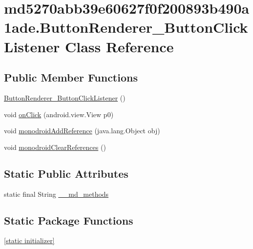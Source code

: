 \hypertarget{classmd5270abb39e60627f0f200893b490a1ade_1_1_button_renderer___button_click_listener}{
\section{md5270abb39e60627f0f200893b490a1ade.ButtonRenderer\_\-ButtonClickListener Class Reference}
\label{classmd5270abb39e60627f0f200893b490a1ade_1_1_button_renderer___button_click_listener}
}
\subsection*{Public Member Functions}
\begin{CompactItemize}
\item 
\hyperlink{classmd5270abb39e60627f0f200893b490a1ade_1_1_button_renderer___button_click_listener_067655cc5bd5198fa2b09218eb107c8a}{ButtonRenderer\_\-ButtonClickListener} ()
\item 
void \hyperlink{classmd5270abb39e60627f0f200893b490a1ade_1_1_button_renderer___button_click_listener_498d522f10f3d9a972aae4d52698573f}{onClick} (android.view.View p0)
\item 
void \hyperlink{classmd5270abb39e60627f0f200893b490a1ade_1_1_button_renderer___button_click_listener_86f4e14df96aec81f38a28a5d72f0edf}{monodroidAddReference} (java.lang.Object obj)
\item 
void \hyperlink{classmd5270abb39e60627f0f200893b490a1ade_1_1_button_renderer___button_click_listener_3ad2ca4f3a271cf9d78dd0f3c022a69b}{monodroidClearReferences} ()
\end{CompactItemize}
\subsection*{Static Public Attributes}
\begin{CompactItemize}
\item 
static final String \hyperlink{classmd5270abb39e60627f0f200893b490a1ade_1_1_button_renderer___button_click_listener_cbb70b7781fb2d4c00834405eb00337a}{\_\-\_\-md\_\-methods}
\end{CompactItemize}
\subsection*{Static Package Functions}
\begin{CompactItemize}
\item 
\hyperlink{classmd5270abb39e60627f0f200893b490a1ade_1_1_button_renderer___button_click_listener_82e36d273a2627c62caa355799237c15}{\mbox{[}static initializer\mbox{]}}
\end{CompactItemize}
